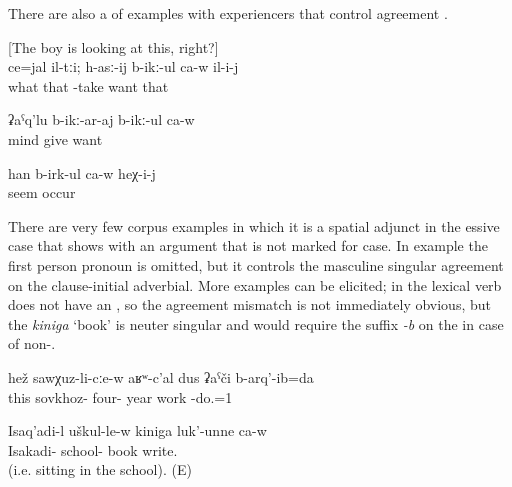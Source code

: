 There are also a  of examples with  experiencers that control  agreement .
%
\begin{exe}
	\ex	\label{ex:Maybe these, he wants to take} [‎The boy is looking at this, right?]\\
	\gll	ce=jal	il-tːi;	h-asː-ij	b-ikː-ul	ca-w	il-i-j\\
		what	that	-take	want		that	\\
	\glt	{}

	\ex	\label{ex:wants to give him knowledge}
	\gll	ʡaˁq'lu	b-ikː-ar-aj	b-ikː-ul	ca-w\\
		mind	give		want	\\
	\glt	{}

	\ex	\label{ex:bring those years back now}
	\gll	han	b-irk-ul	ca-w	heχ-i-j\\
		seem	occur		\\
	\glt	{} 
\end{exe}

There are very few corpus examples in which it is a spatial adjunct in the essive case that shows  with an argument that is not marked for  case. In example  the  first person pronoun is omitted, but it controls the masculine singular agreement on the clause-initial adverbial. More examples can be elicited; in  the lexical verb does not have an , so the agreement mismatch is not immediately obvious, but the   \textit{kiniga} `book' is neuter singular and would require the suffix \textit{-b} on the  in case of non-.

\begin{exe}
	\ex	\label{ex:In the sovkhoz I worked for 40 years.}
	\gll	hež	sawχuz-li-cːe-w	aʁʷ-c'al	dus	ʡaˁči	b-arq'-ib=da\\
			this	sovkhoz-	four-	year	work	-do.=1\\
		\glt	{}
		
			\ex	\label{ex:Isakadi is writing a book in the school.}
	\gll	Isaq'adi-l	uškul-le-w	kiniga	luk'-unne	ca-w\\
		Isakadi-	school-	book	write.		\\
	\glt	{} (i.e. sitting in the school). (E)
\end{exe}

